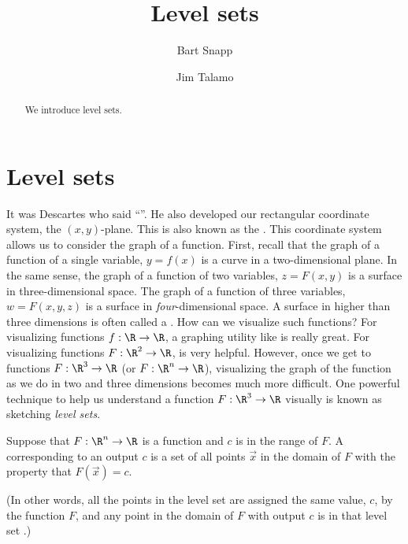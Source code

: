 \documentclass{ximera}
\author{Bart Snapp \and Jim Talamo}
\title[Dig-In:]{Level sets}
\begin{document}
\begin{abstract}
  We introduce level sets.
\end{abstract}
\maketitle




\section{Level sets}

It was Descartes who said ``''. He also
developed our rectangular coordinate system, the $(x,y)$-plane. This
is also known as the .
This coordinate system allows us to consider the graph of a
function. First, recall that the graph of a function of a single
variable, $y=f(x)$ is a curve in a two-dimensional plane.  In the same
sense, the graph of a function of two variables, $z = F(x,y)$ is a
surface in three-dimensional space. The graph of a function of three
variables, $w=F(x,y,z)$ is a surface in \textit{four}-dimensional
space. A surface in higher than three dimensions is often called a
. How can we visualize such functions?  For
visualizing functions $f:\R\to\R$, a graphing utility like
 is really great. For
visualizing functions $F:\R^2\to\R$,
 is very
helpful. However, once we get to functions $F:\R^3\to\R$ (or $F: \R^n \to \R$), visualizing 
the graph of the function as we do in two and three dimensions 
becomes much more difficult.  One
powerful technique to help us understand a function $F:\R^3\to\R$
visually is known as sketching \textit{level sets}.


\begin{definition}
  Suppose that $F:\R^n \to \R$ is a function and $c$ is in the range
  of $F$. A  corresponding to an output $c$ is a set of all points $\vec{x}$
  in the domain of $F$ with the property that $F(\vec{x}) = c$.
  
 (In other words, all the points in the level set are assigned the same value, $c$, by the function $F$, and any point in the domain of $F$ with output $c$ is in that level set .)
\end{definition}
\end{document}
